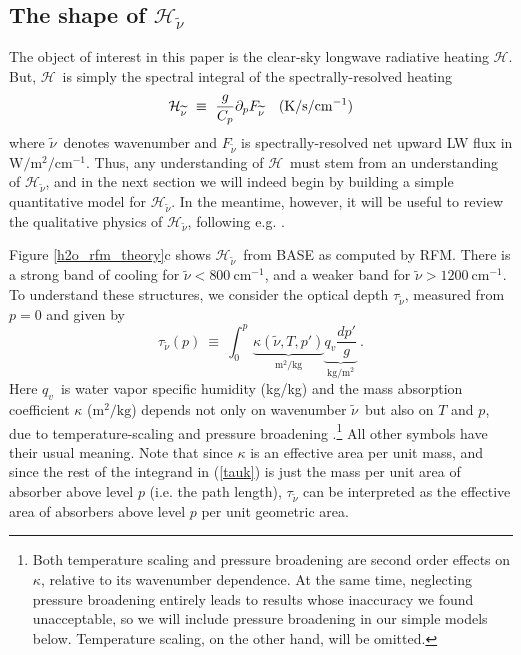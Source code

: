 \documentclass{ametsoc}
\newcommand{\beqn}{\begin{equation}}
\newcommand{\eeqn}{\end{equation}}
\newcommand{\eqnref}[1]{(\ref{#1})}
\newcommand{\kg}{\ensuremath{\mathrm{kg}}}
\newcommand{\meter}{\ensuremath{\mathrm{m}}}
\newcommand{\Wmsq}{\ensuremath{\mathrm{W/m^2}}}
\newcommand{\cminverse}{\ensuremath{\mathrm{cm^{-1}}}}
\newcommand{\ppp}{\ensuremath{\partial_p}}
\newcommand{\Cp}{\ensuremath{C_p}}
\newcommand{\qv}{\ensuremath{q_v}}
\newcommand{\wv}{\ensuremath{\widetilde{\nu}}}
\newcommand{\ch}{\ensuremath{\mathcal{H}}}
\newcommand{\chk}{\ensuremath{\ch_{\wv}}}
\newcommand{\tauk}{\ensuremath{\tau_{\wv}}}
\begin{document}
\subsection{The shape of \chk}
The object of interest in this paper is the clear-sky longwave radiative heating \ch. But, \ch\ is simply the spectral integral of  the spectrally-resolved heating 
\beqn
	\chk \ \equiv \ \frac{g}{\Cp} \ppp F_{\wv} \quad \text{(K/s/\cminverse)}
	\label{heat_k}
\eeqn
where \wv\ denotes wavenumber \citep[following the notation of][]{petty2006,houghton2002} and  $F_{\wv}$ is spectrally-resolved net upward LW flux in $\Wmsq/\cminverse$. Thus,  any understanding of \ch\ must stem from an understanding of \chk, and in the next section we will indeed begin by building a simple quantitative model for \chk.  In the meantime, however, it will be useful to review the qualitative physics of \chk, following e.g.  \cite{harries2008,clough1992}.

Figure \ref{h2o_rfm_theory}c shows \chk\ from BASE as computed by RFM. There is a strong band of cooling for $\wv < 800\ \cminverse$, and a weaker band for $\wv > 1200\ \cminverse$. To understand these structures, we consider   the optical depth $\tauk$, measured from $p=0$  and given by
\beqn
	\tauk(p) \ \equiv  \ \int_0^p \, \underbrace{\kappa(\wv,T,p')}_{\meter^2/\kg} \underbrace{\qv \frac{dp'}{g}}_{\kg/\meter^2}\ .
	\label{tauk}
\eeqn
Here \qv\ is water vapor specific humidity (kg/kg) and the mass absorption coefficient $\kappa$ ($\meter^2/\kg$) depends not only on wavenumber \wv\ but also on $T$ and $p$,  due to temperature-scaling and pressure broadening \citep[][]{pierrehumbert2010}.\footnote{Both temperature scaling and pressure broadening are second order effects on $\kappa$, relative to its wavenumber dependence. At the same time, neglecting pressure broadening entirely  leads to results whose inaccuracy we found unacceptable, so we will  include pressure broadening in our simple models below. Temperature scaling, on the other hand, will be omitted.} All other symbols have their usual meaning. Note that since $\kappa$ is an effective area per unit mass, and since the rest of the integrand in \eqnref{tauk} is just the mass per unit area of absorber above level $p$ (i.e. the path length), $\tauk$ can be interpreted as the effective area of absorbers above level $p$ per unit geometric area.
\end{document}
